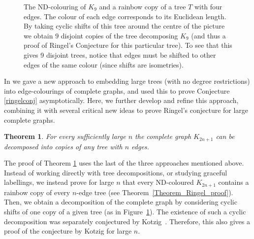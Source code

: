 \documentclass{article}
\newtheorem{theorem}[lemma]{Theorem}
\theoremstyle{definition}
\begin{document}
\begin{figure}[b]

\vspace{-0.4cm}

  \centering


\vspace{-0.3cm}
  \caption{The ND-colouring of $K_9$ and a rainbow copy of a tree $T$ with four edges. The colour of each edge corresponds to its Euclidean length.  By taking cyclic shifts of this tree around the centre of the picture we obtain $9$ disjoint copies of the tree decomposing $K_9$ (and thus a proof of Ringel's Conjecture for this particular tree). To see that this gives 9 disjoint trees, notice that edges must be shifted to other edges of the same colour (since shifts are isometries).}\label{FigureIntro}
  
  \vspace{-0.1cm}
  
\end{figure}



In \cite{MPS} we gave a new approach to embedding large trees (with no degree restrictions) into edge-colourings of complete graphs, and used this to prove Conjecture
\ref{ringelconj} asymptotically. Here, we further develop and refine this approach, combining it with several critical new ideas to prove Ringel's conjecture for large complete graphs.

\begin{theorem}\label{main}
For every sufficiently large $n$ the complete graph $K_{2n+1}$ can be decomposed into copies of any tree with $n$ edges.
\end{theorem}





The proof of Theorem \ref{main} uses the last of the three approaches mentioned above. Instead of  working directly with tree decompositions, or studying graceful labellings, we instead prove for large $n$ that every ND-coloured $K_{2n+1}$ contains a rainbow copy of every $n$-edge tree (see Theorem~\ref{Theorem_Ringel_proof}).
Then, we obtain a decomposition of the complete graph by considering cyclic shifts of one copy of a given tree (as in Figure~\ref{FigureIntro}). The existence of such a cyclic decomposition was separately conjectured by Kotzig~\cite{rosa1966certain}. Therefore, this also gives a proof of the conjecture by Kotzig for large $n$.
\end{document}
